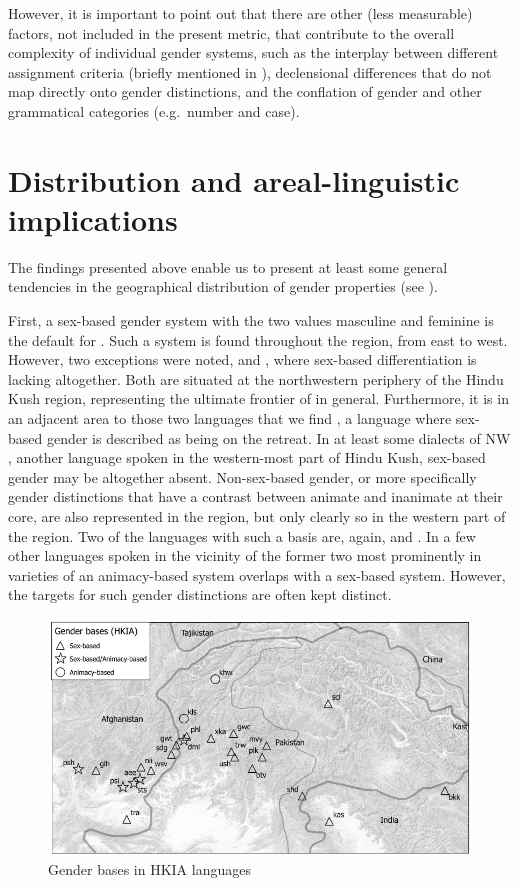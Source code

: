 \documentclass[output=collectionpaper]{langsci/langscibook}
\begin{document}
However, it is important to point out that there are other (less measurable) factors, not included in the present metric, that contribute to the overall complexity of individual gender systems, such as the interplay between different assignment criteria (briefly mentioned in  ), declensional differences that do not map directly onto gender distinctions, and the conflation of gender and other grammatical categories (e.g.\ number and case).

\section{Distribution and areal-linguistic implications}

The findings presented above enable us to present at least some general tendencies in the geographical distribution of gender properties (see ).

First, a sex-based gender system with the two values masculine and feminine is the default for . Such a system is found throughout the region, from east to west. However, two exceptions were noted,  and , where sex-based differentiation is lacking altogether. Both are situated at the northwestern periphery of the Hindu Kush region, representing the ultimate frontier of  in general. Furthermore, it is in an adjacent area to those two languages that we find , a language where sex-based gender is described as being on the retreat. In at least some dialects of NW , another language spoken in the western-most part of Hindu Kush, sex-based gender may be altogether absent. Non-sex-based gender, or more specifically gender distinctions that have a contrast between animate and inanimate at their core, are also represented in the region, but only clearly so in the western part of the region. Two of the languages with such a basis are, again,  and . In a few other languages spoken in the vicinity of the former two \textendash{} most prominently in varieties of  \textendash{} an animacy-based system overlaps with a sex-based system. However, the targets for such gender distinctions are often kept distinct.

\begin{figure}[htb]
\includegraphics[width=\textwidth]{figures/10/map2_2}
\caption{Gender bases in HKIA languages}
\label{fig:Lilje:2}
\end{figure}
\end{document}
